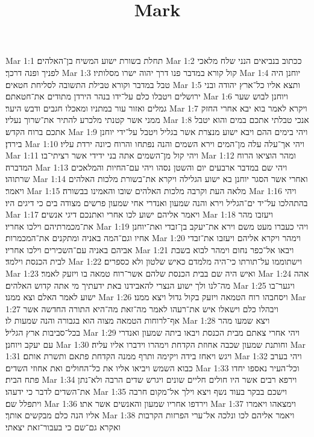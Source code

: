 

\title{Mark}

Mar 1:1  תחלת בשורת ישוע המשיח בן־האלהים׃
Mar 1:2  ככתוב בנביאים הנני שלח מלאכי לפניך ופנה דרכך׃
Mar 1:3  קול קורא במדבר פנו דרך יהוה ישרו מסלותיו׃
Mar 1:4  יוחנן היה טבל במדבר וקורא טבילת התשובה לסליחת חטאים׃
Mar 1:5  ותצא אליו כל־ארץ יהודה ובני ירושלים ויטבלו כלם על־ידו בנהר הירדן מתודים את־חטאתם׃
Mar 1:6  ויוחנן לבוש שער גמלים ואזור עור במתניו ומאכלו חגבים ודבש היער׃
Mar 1:7  ויקרא לאמר בוא יבא אחרי החזק ממני אשר קטנתי מלכרע להתיר את־שרוך נעליו׃
Mar 1:8  אנכי טבלתי אתכם במים והוא יטבל אתכם ברוח הקדש׃
Mar 1:9  ויהי בימים ההם ויבא ישוע מנצרת אשר בגליל ויטבל על־ידי יוחנן בירדן׃
Mar 1:10  ויהי אך־עלה עלה מן־המים וירא השמים והנה נפתחו והרוח כיונה ירדת עליו׃
Mar 1:11  ויהי קול מן־השמים אתה בני ידידי אשר רציתי־בו׃
Mar 1:12  ומהר הוציאו הרוח המדברה׃
Mar 1:13  ויהי שם במדבר ארבעים יום והשטן נסהו ויהי עם־החיות והמלאכים שרתוהו׃
Mar 1:14  ואחרי אשר הסגר יוחנן בא ישוע הגלילה ויקרא את־בשורת מלכות האלהים ויאמר׃
Mar 1:15  מלאה העת וקרבה מלכות האלהים שובו והאמינו בבשורה׃
Mar 1:16  ויהי בהתהלכו על־יד ים־הגליל וירא והנה שמעון ואנדרי אחי שמעון פרשים מצודה בים כי דיגים היו׃
Mar 1:17  ויאמר אליהם ישוע לכו אחרי ואתנכם דיגי אנשים׃
Mar 1:18  ויעזבו מהר את־מכמרתיהם וילכו אחריו׃
Mar 1:19  ויהי כעברו מעט משם וירא את־יעקב בן־זבדי ואת־יוחנן אחיו וגם־המה באניה ומתקנים את־המכמרות׃
Mar 1:20  וימהר ויקרא אליהם ויעזבו את־זבדי אביהם באניה עם־השכירים וילכו אחריו׃
Mar 1:21  ויבאו אל־כפר נחום וימהר לבוא בשבת לבית הכנסת וילמד׃
Mar 1:22  וישתוממו על־תורתו כי־היה מלמדם כאיש שלטון ולא כספרים׃
Mar 1:23  ואיש היה שם בבית הכנסת שלהם אשר־רוח טמאה בו ויזעק לאמר׃
Mar 1:24  אהה מה־לנו ולך ישוע הנצרי להאבידנו באת ידעתיך מי אתה קדוש האלהים׃
Mar 1:25  ויגער־בו ישוע לאמר האלם וצא ממנו׃
Mar 1:26  ויסחבהו רוח הטמאה ויזעק בקול גדול ויצא ממנו׃
Mar 1:27  ויבהלו כלם וישאלו איש את־רעהו לאמר מה־זאת מה־היא התורה החדשה אשר אף־לרוחות הטמאה מצוה הוא בגבורה והנה שמעות לו׃
Mar 1:28  ויצא שמעו מהר בכל־סביבות ארץ הגליל׃
Mar 1:29  ויהי אחרי צאתם מבית הכנסת ויבאו ביתה שמעון ואנדרי עם יעקב ויוחנן׃
Mar 1:30  וחותנת שמעון שכבה אחוזת הקדחת וימהרו וידברו אליו עליה׃
Mar 1:31  ויגש ויאחז בידה ויקימה ותרף ממנה הקדחת פתאם ותשרת אותם׃
Mar 1:32  ויהי בערב כבוא השמש ויביאו אליו את כל־החולים ואת אחוזי השדים׃
Mar 1:33  וכל־העיר נאספו יחדו פתח הבית׃
Mar 1:34  וירפא רבים אשר היו חולים חליים שונים ויגרש שדים הרבה ולא־נתן את־השדים לדבר כי ידעהו׃
Mar 1:35  וישכם בבקר בעוד נשף ויצא וילך אל־מקום חרבה ויתפלל שם׃
Mar 1:36  וירדפו אחריו שמעון והאנשים אשר אתו׃
Mar 1:37  וימצאהו ויאמרו אליו הנה כלם מבקשים אותך׃
Mar 1:38  ויאמר אליהם לכו ונלכה אל־ערי הפרזות הקרבות ואקרא גם־שם כי בעבור־זאת יצאתי׃
